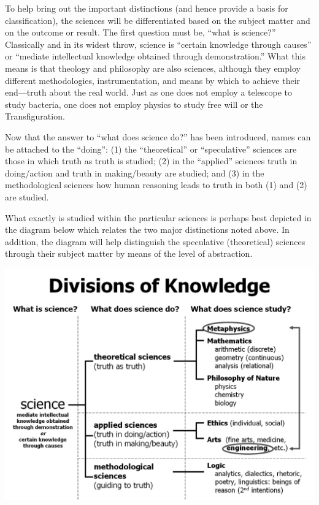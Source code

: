 To help bring out the important distinctions (and hence provide a basis for classification), the sciences will be differentiated based on the subject matter and on the outcome or result. The first question must be, ``what is science?'' Classically and in its widest throw, science is ``certain knowledge through causes'' or ``mediate intellectual knowledge obtained through demonstration.'' What this means is that theology and philosophy are also sciences, although they employ different methodologies, instrumentation, and means by which to achieve their end---truth about the real world. Just as one does not employ a telescope to study bacteria, one does not employ physics to study free will or the Transfiguration.

Now that the answer to ``what does science do?'' has been introduced, names can be attached to the ``doing'': (1) the ``theoretical'' or ``speculative'' sciences are those in which truth as truth is studied; (2) in the ``applied'' sciences truth in doing/action and truth in making/beauty are studied; and (3) in the methodological sciences how human reasoning leads to truth in both (1) and (2) are studied.

What exactly is studied within the particular sciences is perhaps best depicted in the diagram below which relates the two major distinctions noted above. In addition, the diagram will help distinguish the speculative (theoretical) sciences through their subject matter by means of the level of abstraction.

\begin{center}
\includegraphics[scale=0.6]{sich_science_taxonomy.jpg}
\end{center}

